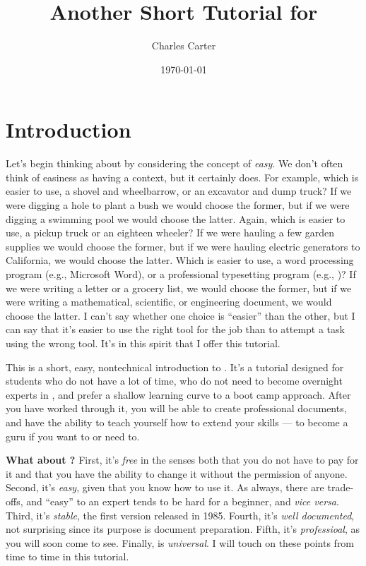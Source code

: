 \documentclass[letterpaper]{article}
\title{Another Short Tutorial for \LaTeXe}
\author{Charles Carter}
\date{\today{}}
\newcommand{\Lx}{\LaTeXe}
\begin{document}
    \maketitle{}
    
    \tableofcontents{}
    \listoffigures{}
    \listoftables{}

    \newpage{}

    \section{Introduction}
    \label{Introduction}

    Let's begin thinking about \Lx{}  by considering the concept of \textit{easy}. We don't often think of easiness as having a context, but it certainly does. For example, which is easier to use, a shovel and wheelbarrow, or an excavator and dump truck? If we were digging a hole to plant a bush we would choose the former, but if we were digging a swimming pool we would choose the latter. Again, which is easier to use, a pickup truck or an eighteen wheeler? If we were hauling a few garden supplies we would choose the former, but if we were hauling electric generators to California, we would choose the latter. Which is easier to use, a word processing program (e.g., Microsoft Word), or a professional typesetting program (e.g., \Lx{})? If we were writing a letter or a grocery list, we would choose the former, but if we were writing a mathematical, scientific, or engineering document, we would choose the latter. I can't say whether one choice is ``easier'' than the other, but I can say that it's easier to use the right tool for the job than to attempt a task using the wrong tool. It's in this spirit that I offer this tutorial. 

    This is a short, easy, nontechnical introduction to \LaTeXe{}. It's a tutorial designed for students who do not have a lot of time, who do not need to become overnight experts in \LaTeXe{}, and prefer a shallow learning curve to a boot camp approach.  After you have worked through it, you will be able to create professional documents, and have the ability to teach yourself how to extend your \LaTeXe{} skills --- to become a \LaTeXe{} guru if you want to or need to.

        \textbf{What about \Lx{}?} First, it's \textit{free} in the senses both that you do not have to pay for it and that you have the ability to change it without the permission of anyone. Second, it's \textit{easy}, given that you know how to use it. As always, there are trade-offs, and ``easy'' to an expert tends to be hard for a beginner, and \textit{vice versa}. Third, it's \textit{stable}, the first version released in 1985. Fourth, it's \textit{well documented}, not surprising since its purpose is document preparation. Fifth, it's \textit{professioal}, as you will soon come to see. Finally, \Lx{} is \textit{universal}. I will touch on these points from time to time in this tutorial.
\end{document}
